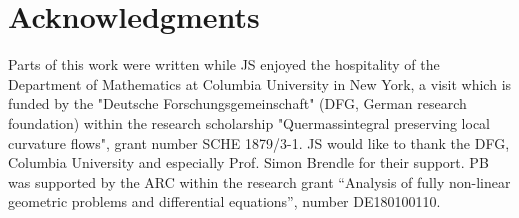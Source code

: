 \documentclass[a4paper,12pt]{amsart}
\begin{document}
\section*{Acknowledgments}

Parts of this work were written while JS enjoyed the hospitality of the Department of Mathematics at Columbia University in New York, a visit which is funded by the "Deutsche Forschungsgemeinschaft" (DFG, German research foundation) within the research scholarship "Quermassintegral preserving local curvature flows", grant number SCHE 1879/3-1. JS would like to thank the DFG, Columbia University and especially Prof. Simon Brendle for their support. PB was supported by the ARC within the research grant “Analysis of fully non-linear geometric problems and differential equations”, number DE180100110.


\printbibliography
\end{document}
